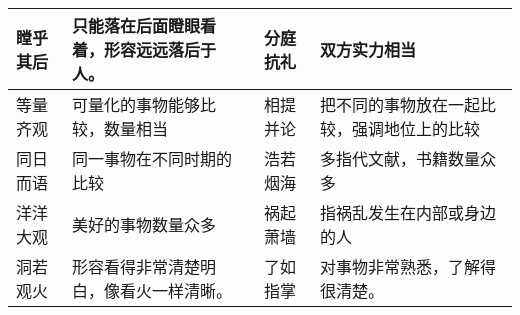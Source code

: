 \begin{longtable}{|p{}|p{}|p{}|p{}|}
    \hline
    瞠乎其后        & 只能落在后面瞪眼看着，形容远远落后于人。               & 分庭抗礼        & 双方实力相当                    \\
    \hline
    等量齐观        & 可量化的事物能够比较，数量相当                    & 相提并论        & 把不同的事物放在一起比较，强调地位上的比较     \\
    \hline
    同日而语        & 同一事物在不同时期的比较                       & 浩若烟海        & 多指代文献，书籍数量众多              \\
    \hline
    洋洋大观        & 美好的事物数量众多                          & 祸起萧墙        & 指祸乱发生在内部或身边的人             \\
    \hline
    洞若观火 & 形容看得非常清楚明白，像看火一样清晰。                & 了如指掌        & 对事物非常熟悉，了解得很清楚。          \\
    \hline
\end{longtable}

